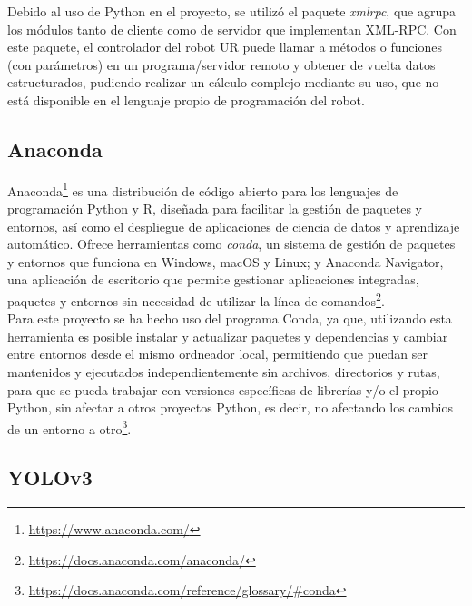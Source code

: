 Debido al uso de Python en el proyecto, se utilizó el paquete \textit{xmlrpc}, que agrupa los módulos tanto de cliente como de servidor que implementan XML-RPC. Con este paquete, el controlador del robot UR puede llamar a métodos o funciones (con parámetros) en un programa/servidor remoto y obtener de vuelta datos estructurados, pudiendo realizar un cálculo complejo mediante su uso, que no está disponible en el lenguaje propio de programación del robot.

\subsection{Anaconda}
\label{sec:Anaconda}

Anaconda\footnote{\url{https://www.anaconda.com/}} es una distribución de código abierto para los lenguajes de programación Python y R, diseñada para facilitar la gestión de paquetes y entornos, así como el despliegue de aplicaciones de ciencia de datos y aprendizaje automático. Ofrece herramientas como \textit{conda}, un sistema de gestión de paquetes y entornos que funciona en Windows, macOS y Linux; y Anaconda Navigator, una aplicación de escritorio que permite gestionar aplicaciones integradas, paquetes y entornos sin necesidad de utilizar la línea de comandos\footnote{\url{https://docs.anaconda.com/anaconda/}}.\\ 

Para este proyecto se ha hecho uso del programa Conda, ya que, utilizando esta herramienta es posible instalar y actualizar paquetes y dependencias y cambiar entre entornos desde el mismo ordneador local, permitiendo que puedan ser mantenidos y ejecutados independientemente sin archivos, directorios y rutas, para que se pueda trabajar con versiones específicas de librerías y/o el propio Python, sin afectar a otros proyectos Python, es decir, no afectando los cambios de un entorno a otro\footnote{\url{https://docs.anaconda.com/reference/glossary/\#conda}}.

\subsection{YOLOv3}
\label{sec:YOLOv3}

